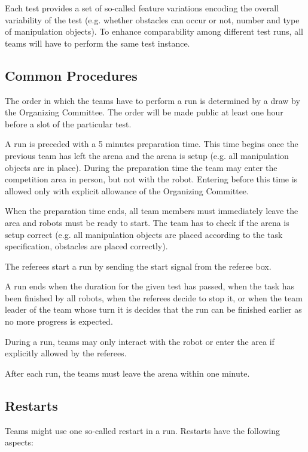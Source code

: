 Each test provides a set of so-called feature variations encoding the overall variability of the test (e.g. whether obstacles can occur or not, number and type of manipulation objects). To enhance comparability among different test runs, all teams will have to perform the same test instance.


\subsection{Common Procedures}
The order in which the teams have to perform a run is determined by a draw by the Organizing Committee. The order will be made public at least one hour before a slot of the particular test.
\par
A run is preceded with a 5 minutes preparation time. This time begins once the previous team has left the arena and the arena is setup (e.g. all manipulation objects are in place). During the preparation time the team may enter the competition area in person, but not with the robot. Entering before this time is allowed only with explicit allowance of the Organizing Committee.
\par
When the preparation time ends, all team members must immediately leave the area and
robots must be ready to start. The team has to check if the arena is setup correct (e.g. all manipulation objects are placed according to the task specification, obstacles are placed correctly).
\par
The referees start a run by sending the start signal from the referee box.
\par
A run ends when the duration for the given test has passed, when the task has been finished by all robots, when the referees decide to stop it, or when the team leader of the team whose turn it is decides that the run can be finished earlier as no more progress is expected.
\par
During a run, teams may only interact with the robot or enter the area if explicitly allowed by the referees.
\par
After each run, the teams must leave the arena within one minute.

\subsection{Restarts}
Teams might use one so-called restart in a run. Restarts have the following aspects:

